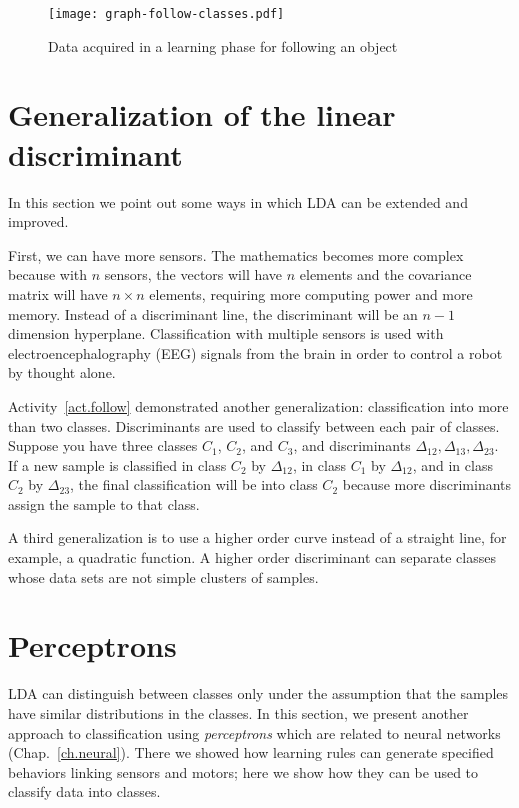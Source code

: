 \begin{figure}
\begin{center}
\texttt{[image: graph-follow-classes.pdf]}
\end{center}
\caption{Data acquired in a learning phase for following an object}\label{fig.machlearnfollow}
\end{figure}

\section{Generalization of the linear discriminant}\label{s.gen-lda}

In this section we point out some ways in which LDA can be extended and improved.

First, we can have more sensors. The mathematics becomes more complex because with $n$ sensors, the vectors will have $n$ elements and the covariance matrix will have $n\times n$ elements, requiring more computing power and more memory. Instead of a discriminant line, the discriminant will be an $n-1$ dimension hyperplane. Classification with multiple sensors is used with electroencephalography (EEG) signals from the brain in order to control a robot by thought alone.

Activity~\ref{act.follow} demonstrated another generalization: classification into more than two classes. Discriminants are used to classify between each pair of classes. Suppose you have three classes $C_1$, $C_2$, and $C_3$, and discriminants $\Delta_{12}, \Delta_{13}, \Delta_{23}$. If a new sample is classified in class $C_2$ by $\Delta_{12}$, in class $C_1$ by $\Delta_{12}$, and in class $C_2$ by $\Delta_{23}$, the final classification will be into class $C_2$ because more discriminants assign the sample to that class.

A third generalization is to use a higher order curve instead of a straight line, for example, a quadratic function. A higher order discriminant can separate classes whose data sets are not simple clusters of samples.

\section{Perceptrons}\label{s.perceptrons}

LDA can distinguish between classes only under the assumption that the samples have similar distributions in the classes. In this section, we present another approach to classification using \emph{perceptrons} which are related to neural networks (Chap.~\ref{ch.neural}). There we showed how learning rules can generate specified behaviors linking sensors and motors; here we show how they can be used to classify data into classes.

